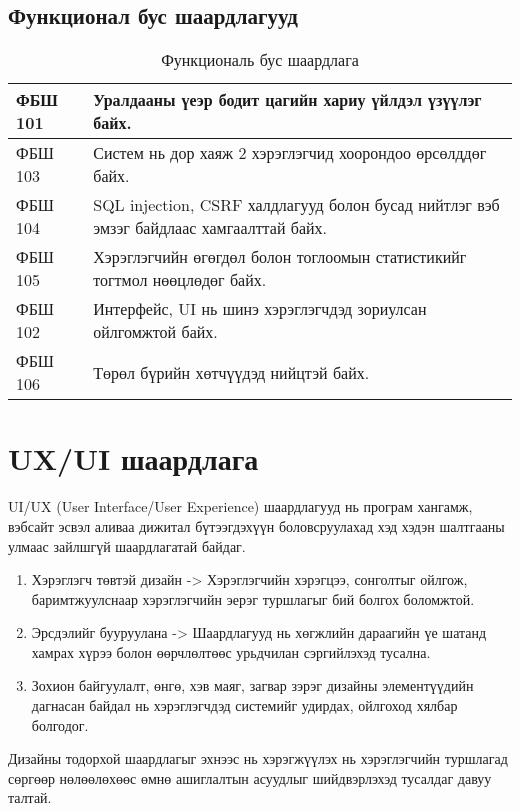 \subsection{Функционал бус шаардлагууд}

\begin{table}[h]
	\centering
	\caption{Функциональ бус шаардлага}
	\begin{tabular}{ |p{2cm}|p{13cm}| }
		\hline
		ФБШ 101 & Уралдааны үеэр бодит цагийн хариу үйлдэл үзүүлэг байх.                                  \\ \hline
		ФБШ 103 & Систем нь дор хаяж 2 хэрэглэгчид хоорондоо өрсөлддөг байх.                               \\ \hline
		ФБШ 104 & SQL injection, CSRF халдлагууд болон бусад нийтлэг вэб эмзэг байдлаас хамгаалттай байх. \\ \hline
		ФБШ 105 & Хэрэглэгчийн өгөгдөл болон тоглоомын статистикийг тогтмол нөөцлөдөг байх.               \\ \hline
		ФБШ 102 & Интерфейс, UI нь шинэ хэрэглэгчдэд зориулсан ойлгомжтой байх.                            \\ \hline
		ФБШ 106 & Төрөл бүрийн хөтчүүдэд нийцтэй байх.      \\  \hline
	\end{tabular}
\end{table}

\section{UX/UI шаардлага}

UI/UX (User Interface/User Experience) шаардлагууд нь програм хангамж, вэбсайт эсвэл аливаа дижитал бүтээгдэхүүн боловсруулахад хэд хэдэн шалтгааны улмаас зайлшгүй шаардлагатай байдаг.

\begin{enumerate}
	\item Хэрэглэгч төвтэй дизайн -> Хэрэглэгчийн хэрэгцээ, сонголтыг ойлгож, баримтжуулснаар хэрэглэгчийн эерэг туршлагыг бий болгох боломжтой.
	\item Эрсдэлийг бууруулана -> Шаардлагууд нь хөгжлийн дараагийн үе шатанд хамрах хүрээ болон өөрчлөлтөөс урьдчилан сэргийлэхэд тусална.
	\item Зохион байгуулалт, өнгө, хэв маяг, загвар зэрэг дизайны элементүүдийн дагнасан байдал нь хэрэглэгчдэд системийг удирдах, ойлгоход хялбар болгодог.
\end{enumerate}

Дизайны тодорхой шаардлагыг эхнээс нь хэрэгжүүлэх нь хэрэглэгчийн туршлагад сөргөөр нөлөөлөхөөс өмнө ашиглалтын асуудлыг шийдвэрлэхэд тусалдаг давуу талтай.


